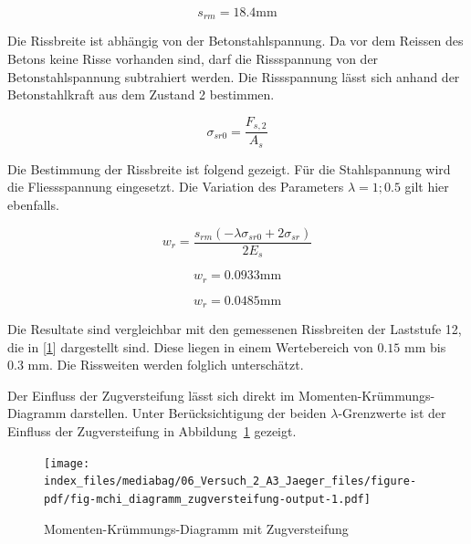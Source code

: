 \documentclass[
  12pt,
  letterpaper,
  egregdoesnotlikesansseriftitles]{scrreprt}
\begin{document}
\begin{equation}s_{rm} = 18.4 \text{mm}\end{equation}

Die Rissbreite ist abhängig von der Betonstahlspannung. Da vor dem
Reissen des Betons keine Risse vorhanden sind, darf die Rissspannung von
der Betonstahlspannung subtrahiert werden. Die Rissspannung lässt sich
anhand der Betonstahlkraft aus dem Zustand 2 bestimmen.

\begin{equation}\sigma_{sr0} = \frac{F_{s,2}}{A_{s}}\end{equation}

Die Bestimmung der Rissbreite ist folgend gezeigt. Für die Stahlspannung
wird die Fliessspannung eingesetzt. Die Variation des Parameters
\(\lambda = 1 ; 0.5\) gilt hier ebenfalls.

\begin{equation}w_{r} = \frac{s_{rm} \left(- \lambda \sigma_{sr0} + 2 \sigma_{sr}\right)}{2 E_{s}}\end{equation}

\begin{equation}w_{r} = 0.0933 \text{mm}\end{equation}

\begin{equation}w_{r} = 0.0485 \text{mm}\end{equation}

Die Resultate sind vergleichbar mit den gemessenen Rissbreiten der
Laststufe 12, die in {[}\protect\hyperlink{ref-Jaeger2006}{1}{]}
dargestellt sind. Diese liegen in einem Wertebereich von
\(0.15 \text{ mm}\) bis \(0.3 \text{ mm}\). Die Rissweiten werden
folglich unterschätzt.

Der Einfluss der Zugversteifung lässt sich direkt im
Momenten-Krümmungs-Diagramm darstellen. Unter Berücksichtigung der
beiden \(\lambda\)-Grenzwerte ist der Einfluss der Zugversteifung in
Abbildung~\ref{fig-mchi_diagramm_zugversteifung} gezeigt.

\begin{figure}[H]

{\centering \texttt{[image: index\_files/mediabag/06\_Versuch\_2\_A3\_Jaeger\_files/figure-pdf/fig-mchi\_diagramm\_zugversteifung-output-1.pdf]}

}

\caption{\label{fig-mchi_diagramm_zugversteifung}Momenten-Krümmungs-Diagramm
mit Zugversteifung}

\end{figure}
\end{document}
